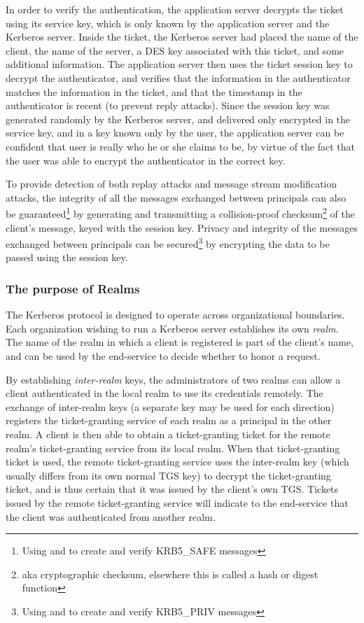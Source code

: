 In order to verify the authentication, the application server decrypts
the ticket using its service key, which is only known by the application
server and the Kerberos server.  Inside the ticket, the Kerberos server
had placed the name of the client, the name of the server, a DES key
associated with this ticket, and some additional information.  The
application server then uses the ticket session key to decrypt the
authenticator, and verifies that the information in the authenticator
matches the information in the ticket, and that the timestamp in the
authenticator is recent (to prevent reply attacks).  Since the session
key was generated randomly by the Kerberos server, and delivered only
encrypted in the service key, and in a key known only by the user, the
application server can be confident that user is really who he or she
claims to be, by virtue of the fact that the user was able to encrypt
the authenticator in the correct key.

To provide detection of both replay
attacks and message stream modification attacks, the integrity of all
the messages exchanged between principals can also be 
guar\-an\-teed\footnote{Using
 and  to create and
verify KRB5_SAFE messages} by generating and transmitting a
collision-proof checksum\footnote{aka cryptographic checksum,
elsewhere this is called a hash or digest function} of the client's
message, keyed with the session key.  Privacy and integrity of the
messages exchanged between principals can be secured\footnote{Using
 and  to create and
verify KRB5_PRIV messages} by encrypting the data to be passed using
the session key.

\subsubsection{The purpose of Realms}

The Kerberos protocol is designed to operate across organizational
boundaries.   Each organization wishing to run a Kerberos
server establishes its own {\em realm}.  The name of the realm in which a
client is registered is part of the client's name, and can be used by the
end-service to decide whether to honor a request.

By establishing {\em inter-realm} keys, the administrators of two
realms can allow a client authenticated in the local realm to use its
credentials remotely.  The exchange of inter-realm keys (a separate
key may be used for each direction) registers the ticket-granting
service of each realm as a principal in the other realm.  A client is
then able to obtain a ticket-granting ticket for the remote realm's
ticket-granting service from its local realm.  When that
ticket-granting ticket is used, the remote ticket-granting service
uses the inter-realm key (which usually differs from its own normal
TGS key) to decrypt the ticket-granting ticket, and is thus certain
that it was issued by the client's own TGS. Tickets issued by the
remote ticket-granting service will indicate to the end-service that
the client was authenticated from another realm.   


